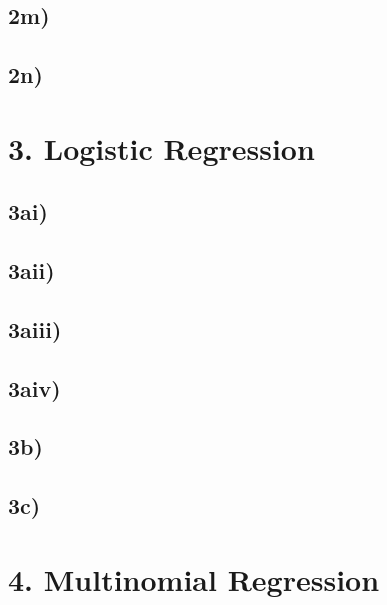 \documentclass[
]{article}
\begin{document}
\hypertarget{m}{%
\subsection{2m)}\label{m}}

\hypertarget{n}{%
\subsection{2n)}\label{n}}

\hypertarget{logistic-regression}{%
\section{3. Logistic Regression}\label{logistic-regression}}

\hypertarget{ai}{%
\subsection{3ai)}\label{ai}}

\hypertarget{aii}{%
\subsection{3aii)}\label{aii}}

\hypertarget{aiii}{%
\subsection{3aiii)}\label{aiii}}

\hypertarget{aiv}{%
\subsection{3aiv)}\label{aiv}}

\hypertarget{b-1}{%
\subsection{3b)}\label{b-1}}

\hypertarget{c-2}{%
\subsection{3c)}\label{c-2}}

\hypertarget{multinomial-regression}{%
\section{4. Multinomial Regression}\label{multinomial-regression}}
\end{document}
